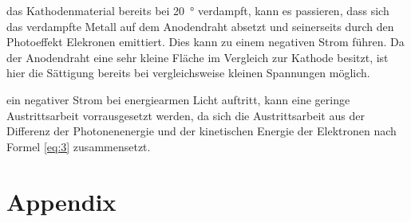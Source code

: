     \justifying das Kathodenmaterial bereits bei \SI{20}{\degree} verdampft, kann es passieren, dass sich das verdampfte Metall auf dem Anodendraht absetzt und
    seinerseits durch den Photoeffekt Elekronen emittiert. Dies kann zu einem negativen Strom führen. Da der Anodendraht eine sehr kleine Fläche im Vergleich zur Kathode besitzt, 
    ist hier die Sättigung bereits bei vergleichsweise kleinen Spannungen möglich. 

    \justifying ein negativer Strom bei energiearmen Licht auftritt, kann eine geringe Austrittsarbeit vorrausgesetzt werden, da sich die Austrittsarbeit aus der 
    Differenz der Photonenenergie und der kinetischen Energie der Elektronen nach Formel \eqref{eq:3} zusammensetzt.

\newpage
\printbibliography

\newpage
\section{Appendix}

\begin{table}[H]
    \centering
    \caption{}
    
    \label{tab:1}
\end{table}

\begin{table}[H]
    \centering
    \caption{}
    
    \label{tab:2}
\end{table}

\begin{table}[H]
    \centering
    \caption{}
    
    \label{tab:3}
\end{table}




